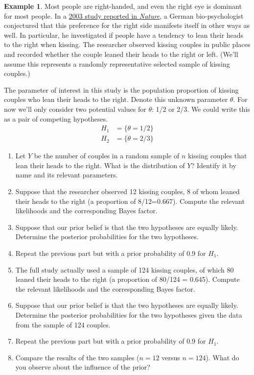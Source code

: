\documentclass[
]{book}
\providecommand{\tightlist}{%
  \setlength{\itemsep}{0pt}\setlength{\parskip}{0pt}}
\theoremstyle{definition}
\theoremstyle{definition}
\newtheorem{example}{Example}[chapter]
\theoremstyle{definition}
\theoremstyle{remark}
\begin{document}
\begin{example}
\protect\hypertarget{exm:kissing-intro}{}{\label{exm:kissing-intro} }
Most people are right-handed, and even the right eye is dominant for most people.
In a \href{http://www.nature.com/news/2003/030213/full/news030210-7.html}{2003 study reported in \emph{Nature}}, a German bio-psychologist conjectured that this preference for the right side manifests itself in other ways as well.
In particular, he investigated if people have a tendency to lean their heads to the right when kissing.
The researcher observed kissing couples in public places and recorded whether the couple leaned their heads to the right or left.
(We'll assume this represents a randomly representative selected sample of kissing couples.)

The parameter of interest in this study is the population proportion of kissing couples who lean their heads to the right. Denote this unknown parameter \(\theta\). For now we'll only consider two potential values for \(\theta\): 1/2 or 2/3. We could write this as a pair of competing hypotheses.
\begin{align*}
  H_1 & = \{\theta = 1/2\}\\
  H_2 & = \{\theta = 2/3\}
\end{align*}
\end{example}

\begin{enumerate}
\def\labelenumi{\arabic{enumi}.}
\tightlist
\item
  Let \(Y\) be the number of couples in a random sample of \(n\) kissing couples that lean their heads to the right. What is the distribution of \(Y\)? Identify it by name and its relevant parameters.
\item
  Suppose that the researcher observed 12 kissing couples, 8 of whom leaned their heads to the right (a proportion of 8/12=0.667). Compute the relevant likelihoods and the corresponding Bayes factor.
\item
  Suppose that our prior belief is that the two hypotheses are equally likely. Determine the posterior probabilities for the two hypotheses.
\item
  Repeat the previous part but with a prior probability of 0.9 for \(H_1\).
\item
  The full study actually used a sample of 124 kissing couples, of which 80 leaned their heads to the right (a proportion of 80/124 = 0.645). Compute the relevant likelihoods and the corresponding Bayes factor.
\item
  Suppose that our prior belief is that the two hypotheses are equally likely. Determine the posterior probabilities for the two hypotheses given the data from the sample of 124 couples.
\item
  Repeat the previous part but with a prior probability of 0.9 for \(H_1\).
\item
  Compare the results of the two samples (\(n=12\) versus \(n=124\)). What do you observe about the influence of the prior?
\end{enumerate}
\end{document}
